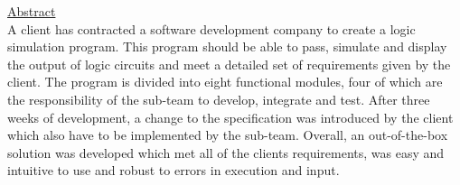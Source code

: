\documentclass{article}					%
\begin{document}
\begin{titlepage}
\begin{flushleft}
\vspace{1.5 cm}
\underline{Abstract}\\					%
A client has contracted a software development company to create a logic simulation program. This program should be able to pass, simulate and display the output of logic circuits and meet a detailed set of requirements given by the client. The program is divided into eight functional modules, four of which are the responsibility of the sub-team to develop, integrate and test. After three weeks of development, a change to the specification was introduced by the client which also have to be implemented by the sub-team. Overall, an out-of-the-box solution was developed which met all of the clients requirements, was easy and intuitive to use and robust to errors in execution and input.

\vspace*{\fill}

\end{flushleft}
\end{titlepage}							%

\end{document}
